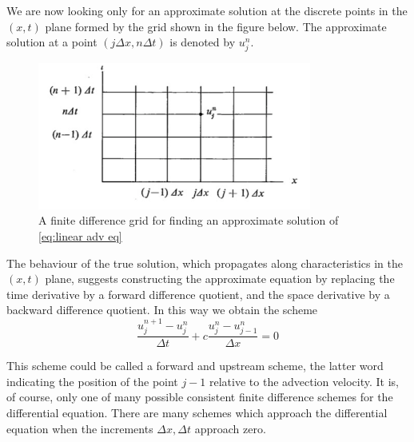 We are now looking only for an approximate solution at the discrete points in the $(x,t)$ plane formed by the grid shown in the figure below. The approximate solution at a point $(j\Delta x,n\Delta t)$ is denoted by $u^n_j$.
\begin{figure}[h]
    \centering
    \includegraphics[width=9cm]{uploads/image.png}
    \caption{A finite difference grid for finding an approximate solution of \ref{eq:linear adv eq}}
    \label{fig:grid sol lin adv eq}
\end{figure}
The behaviour of the true solution, which propagates along characteristics in the $(x,t)$ plane, suggests constructing the approximate equation by replacing the time derivative by a forward difference quotient, and the space derivative by a backward difference quotient. In this way we obtain the scheme
\begin{equation}\label{eq:forward and upward scheme}
    \frac{u_j^{n+1}-u_j^n}{\Delta t}+c\frac{u_j^n-u^n_{j-1}}{\Delta x}=0
\end{equation}

This scheme could be called a forward and upstream scheme, the latter word indicating the position of the point $j-1$ relative to the advection velocity. It is, of course, only one of many possible consistent finite difference schemes for the differential equation. There are many schemes which approach the differential equation when the increments $\Delta x,\Delta t$ approach zero.

